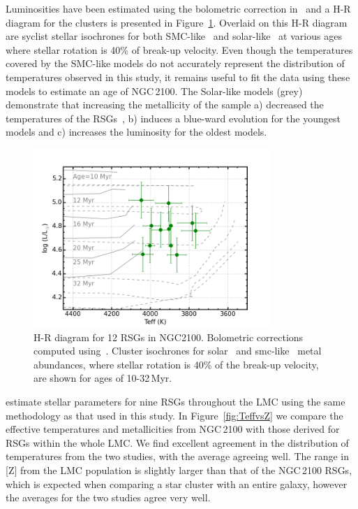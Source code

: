 \documentclass[useAMS,usenatbib]{mn2e}
\begin{document}
Luminosities have been estimated using the bolometric correction in~\cite{2013ApJ...767....3D} and a H-R diagram for the clusters is presented in Figure~\ref{fig:HRD}.
Overlaid on this H-R diagram are {\sc syclist} stellar isochrones for both SMC-like~\citep[solid lines][]{2013A&A...558A.103G} and solar-like~\citep[dashed lines][]{} at various ages where stellar rotation is 40\% of break-up velocity.
Even though the temperatures covered by the SMC-like models do not accurately represent the distribution of temperatures observed in this study, it remains useful to fit the data using these models to estimate an age of NGC\,2100.
The Solar-like models (grey) demonstrate that increasing the metallicity of the sample
a) decreased the temperatures of the RSGs~\citep[something which is not observed in][]{2015ApJ...803...14P},
b) induces a blue-ward evolution for the youngest models and
c) increases the luminosity for the oldest models.



\begin{figure}
 \includegraphics[width=9.0cm]{NGC2100-HRD-iso}
 \caption{H-R diagram for 12 RSGs in NGC2100.
  Bolometric corrections computed using~\citet{2013ApJ...767....3D}.
  Cluster isochrones for solar~\citep[dashed lines][]{2012A&A...537A.146E} and smc-like~\citep[solid lines][]{2013A&A...558A.103G} metal abundances,
  where stellar rotation is 40\% of the break-up velocity, are shown for ages of 10-32\,Myr.\label{fig:HRD}
          }
\end{figure}


\citet{2015ApJ...806...21D} estimate stellar parameters for nine RSGs throughout the LMC using the same methodology as that used in this study.
In Figure~\ref{fig:TeffvsZ} we compare the effective temperatures and metallicities from NGC\,2100 with those derived for RSGs within the whole LMC.
We find excellent agreement in the distribution of temperatures from the two studies, with the average agreeing well.
The range in [Z] from the LMC population is slightly larger than that of the NGC\,2100 RSGs, which is expected when comparing a star cluster with an entire galaxy, however the averages for the two studies agree very well.
\end{document}

